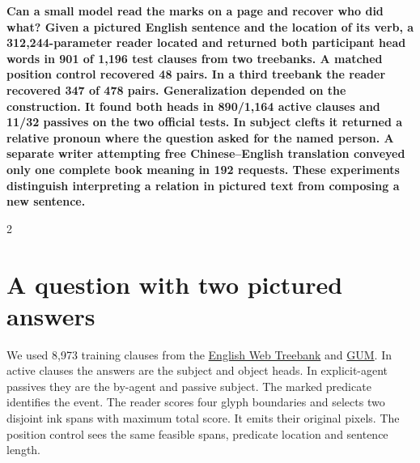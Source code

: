 \noindent\textbf{Can a small model read the marks on a page and recover who did what? Given a pictured English sentence and the location of its verb, a 312,244-parameter reader located and returned both participant head words in 901 of 1,196 test clauses from two treebanks. A matched position control recovered 48 pairs. In a third treebank the reader recovered 347 of 478 pairs. Generalization depended on the construction. It found both heads in 890/1,164 active clauses and 11/32 passives on the two official tests. In subject clefts it returned a relative pronoun where the question asked for the named person. A separate writer attempting free Chinese--English translation conveyed only one complete book meaning in 192 requests. These experiments distinguish interpreting a relation in pictured text from composing a new sentence.}\par
\begin{multicols}{2}
\section*{A question with two pictured answers}
We used 8,973 training clauses from the \href{https://universaldependencies.org/treebanks/en_ewt/}{English Web Treebank} and \href{https://universaldependencies.org/treebanks/en_gum/}{GUM}. In active clauses the answers are the subject and object heads. In explicit-agent passives they are the by-agent and passive subject. The marked predicate identifies the event. The reader scores four glyph boundaries and selects two disjoint ink spans with maximum total score. It emits their original pixels. The position control sees the same feasible spans, predicate location and sentence length.
\end{multicols}
